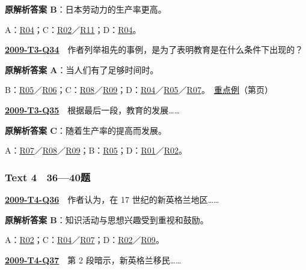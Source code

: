 \documentclass[11pt,a4paper]{article}
\begin{document}
\noindent\textbf{原解析答案 B}：日本劳动力的生产率更高。\par\nopagebreak
\noindent A：\hyperref[cat-R04]{R04}；C：\hyperref[cat-R02]{R02}／\hyperref[cat-R11]{R11}；D：\hyperref[cat-R04]{R04}。\par\smallskip
{}\label{idx-2009-T3-Q34}\noindent\textbf{\href{https://zj139.github.io/math-notes/english/218135c1190c9ac029fd9ef3/\#q34}{2009-T3-Q34}}　作者列举祖先的事例，是为了表明教育是在什么条件下出现的？\par\nopagebreak
\noindent\textbf{原解析答案 A}：当人们有了足够时间时。\par\nopagebreak
\noindent B：\hyperref[cat-R05]{R05}／\hyperref[cat-R06]{R06}；C：\hyperref[cat-R08]{R08}／\hyperref[cat-R09]{R09}；D：\hyperref[cat-R04]{R04}／\hyperref[cat-R05]{R05}／\hyperref[cat-R07]{R07}。　\hyperref[case-2009-T3-Q34]{重点例}（第\pageref{case-2009-T3-Q34}页）\par\smallskip
{}\label{idx-2009-T3-Q35}\noindent\textbf{\href{https://zj139.github.io/math-notes/english/218135c1190c9ac029fd9ef3/\#q35}{2009-T3-Q35}}　根据最后一段，教育的发展……\par\nopagebreak
\noindent\textbf{原解析答案 C}：随着生产率的提高而发展。\par\nopagebreak
\noindent A：\hyperref[cat-R07]{R07}／\hyperref[cat-R08]{R08}／\hyperref[cat-R09]{R09}；B：\hyperref[cat-R05]{R05}；D：\hyperref[cat-R01]{R01}／\hyperref[cat-R02]{R02}。\par\smallskip
{}\subsubsection{Text 4　36—40题}
\label{idx-2009-T4-Q36}\noindent\textbf{\href{https://zj139.github.io/math-notes/english/2431fdcbaabb4f629f70bb44/\#q36}{2009-T4-Q36}}　作者认为，在 17 世纪的新英格兰地区……\par\nopagebreak
\noindent\textbf{原解析答案 B}：知识活动与思想兴趣受到重视和鼓励。\par\nopagebreak
\noindent A：\hyperref[cat-R02]{R02}；C：\hyperref[cat-R04]{R04}／\hyperref[cat-R07]{R07}；D：\hyperref[cat-R02]{R02}／\hyperref[cat-R09]{R09}。\par\smallskip
{}\label{idx-2009-T4-Q37}\noindent\textbf{\href{https://zj139.github.io/math-notes/english/2431fdcbaabb4f629f70bb44/\#q37}{2009-T4-Q37}}　第 2 段暗示，新英格兰移民……\par\nopagebreak
\end{document}
